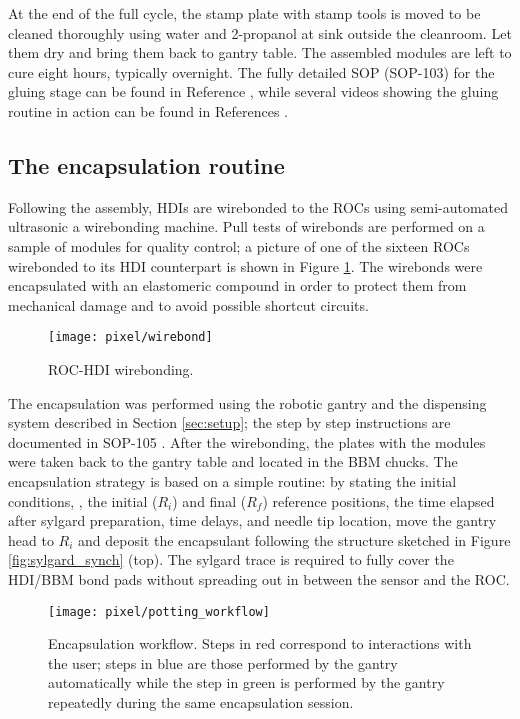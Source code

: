 At the end of the full cycle, the stamp plate with stamp tools is moved to be cleaned thoroughly using water and 2-propanol at sink outside the cleanroom. Let them dry and bring them back to gantry table. The assembled modules are left to cure eight hours, typically overnight. The fully detailed SOP (SOP-103) for the gluing stage can be found in Reference \cite{sop_103}, while several videos showing the gluing routine in action can be found in References \cite{gluing_frank, jmonroy_channel}. 

\subsection{The encapsulation routine}

Following the assembly, HDIs are wirebonded to the ROCs using semi-automated ultrasonic a wirebonding machine. Pull tests of wirebonds are performed on a sample of modules for quality control; a picture of one of the sixteen ROCs wirebonded to its HDI counterpart is shown in Figure \ref{fig:wirebonds}. The wirebonds were encapsulated with an elastomeric compound in order to protect them from mechanical damage and to avoid possible shortcut circuits.

\begin{figure}[h]
\begin{center}
  \texttt{[image: pixel/wirebond]}
 \caption[ROC-HDI wirebonding.]{ROC-HDI wirebonding.}\label{fig:wirebonds}
\end{center}
\end{figure}

The encapsulation was performed using the robotic gantry and the dispensing system described in Section \ref{sec:setup}; the step by step instructions are documented in SOP-105 \cite{sop_105}. After the wirebonding, the plates with the modules were taken back to the gantry table and located in the BBM chucks. The encapsulation strategy is based on a simple routine: by stating the initial conditions, \ie, the initial ($R_i$) and final ($R_f$) reference positions, the time elapsed after sylgard preparation, time delays, and needle tip location, move the gantry head to $R_i$ and deposit the encapsulant following the structure sketched in Figure \ref{fig:sylgard_synch} (top). The sylgard trace is required to fully cover the HDI/BBM bond pads without spreading out in between the sensor and the ROC.

\begin{figure}[h]
\begin{center}
  \texttt{[image: pixel/potting\_workflow]}
  \caption[Encapsulation workflow.]{Encapsulation workflow. Steps in red correspond to interactions with the user; steps in blue are those performed by the gantry automatically while the step in green is performed by the gantry repeatedly during the same encapsulation session.}\label{fig:potting_workflow}
\end{center}
\end{figure}

